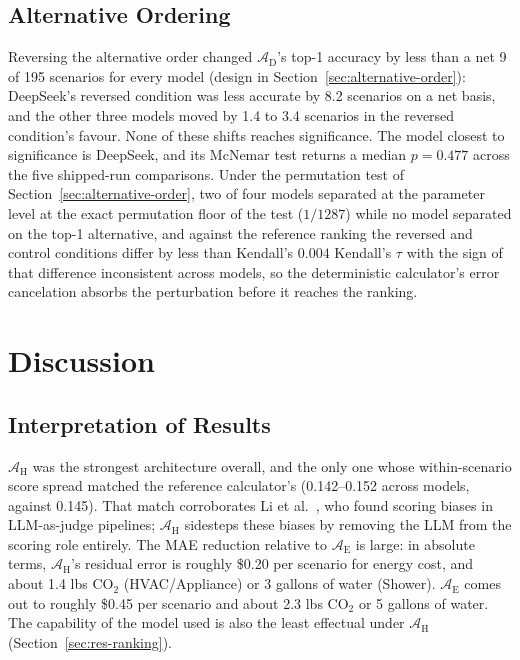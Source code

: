 \documentclass[final,3p,times]{elsarticle}
\begin{document}
\FloatBarrier
\subsection{Alternative Ordering}
\label{sec:res-order}

Reversing the alternative order changed $\mathcal{A}_{\text{D}}$'s top-1 accuracy by less than a net 9 of 195 scenarios for every model (design in Section~\ref{sec:alternative-order}): DeepSeek's reversed condition was less accurate by 8.2 scenarios on a net basis, and the other three models moved by 1.4 to 3.4 scenarios in the reversed condition's favour. None of these shifts reaches significance. The model closest to significance is DeepSeek, and its McNemar test returns a median $p = 0.477$ across the five shipped-run comparisons. Under
 the permutation test of Section~\ref{sec:alternative-order}, two of four models separated at the parameter level at the exact permutation floor of the test ($1/1287$) while no model separated on the top-1 alternative, and against the reference ranking the reversed and control conditions differ by less than Kendall's $0.004$ Kendall's $\tau$ with the sign of that difference inconsistent across models, so the deterministic calculator's error cancelation absorbs the perturbation before it reaches the ranking.
 


\FloatBarrier
\section{Discussion}
\label{sec:discussion}

\FloatBarrier
\subsection{Interpretation of Results}
\label{sec:interpretation}
$\mathcal{A}_{\text{H}}$ was the strongest architecture overall, and the only one whose within-scenario score spread matched the reference calculator's (0.142--0.152 across models, against 0.145). That match corroborates Li et al.~\cite{li2026scoringbias}, who found scoring biases in LLM-as-judge pipelines; $\mathcal{A}_{\text{H}}$ sidesteps these biases by removing the LLM from the scoring role entirely. The MAE reduction relative to $\mathcal{A}_{\text{E}}$ is large: in absolute terms, $\mathcal{A}_{\text{H}}$'s residual error is roughly \$0.20 per scenario for energy cost, and about 1.4 lbs CO$_2$ (HVAC/Appliance) or 3 gallons of water (Shower). $\mathcal{A}_{\text{E}}$ comes out to roughly \$0.45 per scenario and about 2.3 lbs CO$_2$ or 5 gallons of water. The capability of the model used is also the least effectual under $\mathcal{A}_{\text{H}}$ (Section~\ref{sec:res-ranking}).
\end{document}
